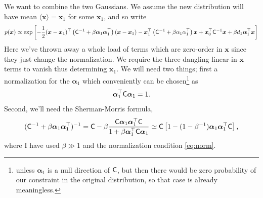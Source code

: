 \documentclass[11pt,a4paper,preprint]{aastex}
\newcommand{\bmath}[1]{\ensuremath{\bm{#1}}}
\renewcommand{\vec}[1]{\bmath{#1}}
\newcommand{\tens}[1]{{\bf \sf #1}}
\begin{document}
We want to combine the two Gaussians. We assume the new distribution
will have mean $\langle \vec{x} \rangle = \vec{x}_1$ for some
$\vec{x}_1$, and so write
\begin{equation}
p(\vec{x}) \propto \exp \left[-\frac{1}{2} (\vec{x} -
  \vec{x}_1)^{\top} \left(\tens{C}^{-1} + \beta \vec{\alpha}_1
    \vec{\alpha}_1^{\top} \right) (\vec{x}-\vec{x}_1) -
  \vec{x}_1^{\top} \left(\tens{C}^{-1} + \beta \alpha_1
    \alpha_1^{\top} \right) \vec{x} +
  \vec{x}_0^{\top}\tens{C}^{-1}\vec{x} + \beta d_1
  \vec{\alpha}_1^{\top} \vec{x}  \right]
\end{equation}
Here we've thrown away a whole load of terms which are zero-order in
$\vec{x}$ since they just change the normalization. We require the
three dangling linear-in-$\vec{x}$ terms to vanish thus determining
$\vec{x}_1$. We will need two things; first a normalization for the $\vec{\alpha}_1$ which conveniently can
be chosen\footnote{unless $\vec{\alpha}_1$ is a null direction of
  $\tens{C}$, but then there would be zero probability of our
  constraint in the original distribution, so that case is already meaningless. } as 
\begin{equation}
\vec{\alpha}_1^{\top} \tens{C} \vec{\alpha}_1 = 1\textrm{.}\label{eq:norm}
\end{equation}
Second, we'll need the Sherman-Morris formula,
\begin{equation}
(\tens{C}^{-1} + \beta \vec{\alpha}_1 \vec{\alpha}_1^{\top})^{-1} =\tens{C} - \beta \frac{\tens{C} \vec{\alpha}_1 \vec{\alpha}_1^{\top}
  \tens{C}}{1+\beta \vec{\alpha}_1^{\top} \tens{C} \vec{\alpha}_1}
\simeq \tens{C} \left[ 1-(1-\beta^{-1}) \vec{\alpha}_1
  \vec{\alpha}_1^{\top} \tens{C} \right] \textrm{,}
\end{equation}
where I have used $\beta \gg 1$ and the normalization condition
\eqref{eq:norm}.
\end{document}
